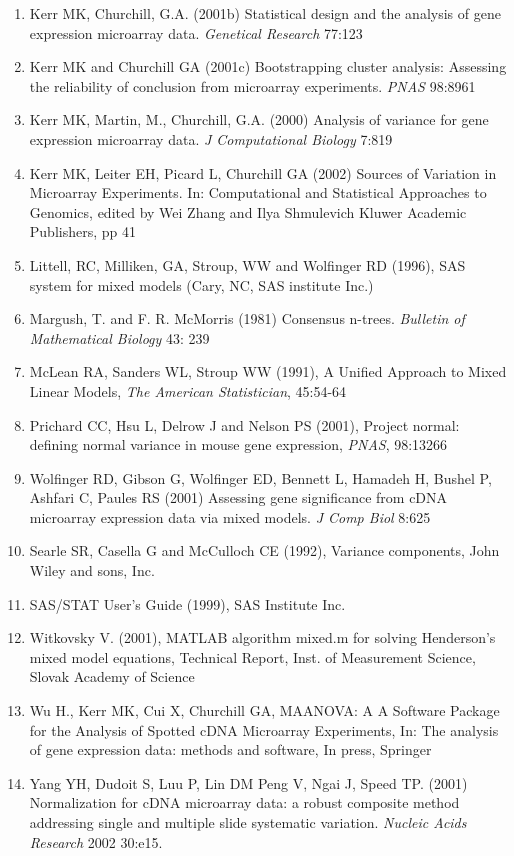 \begin{enumerate}
\item Kerr MK, Churchill, G.A. (2001b)
Statistical design and the analysis of gene expression microarray data.
\textit{Genetical Research} 77:123

\item Kerr MK and Churchill GA (2001c)
Bootstrapping cluster analysis: Assessing the reliability of conclusion from
microarray experiments.  \textit{PNAS} 98:8961

\item Kerr MK, Martin, M., Churchill, G.A. (2000)
Analysis of variance for gene expression microarray data.
\textit{J Computational Biology} 7:819

\item Kerr MK, Leiter EH, Picard L, Churchill GA (2002)
Sources of Variation in Microarray Experiments.
 In:
Computational and Statistical Approaches to Genomics, edited by
Wei Zhang and Ilya Shmulevich
Kluwer Academic Publishers, pp 41

\item Littell, RC, Milliken, GA, Stroup, WW and Wolfinger RD (1996), 
SAS system for mixed models (Cary, NC, SAS institute Inc.)

\item Margush, T. and F. R. McMorris (1981) Consensus n-trees.
\textit{Bulletin of Mathematical Biology} 43: 239

\item McLean RA, Sanders WL, Stroup WW (1991), A Unified Approach to
Mixed Linear Models, \textit{The American Statistician}, 45:54-64

\item Prichard CC, Hsu L, Delrow J and Nelson PS (2001), 
Project normal: defining normal variance in mouse gene expression, 
\textit{PNAS}, 98:13266

\item Wolfinger RD, Gibson G, Wolfinger ED, Bennett L, Hamadeh H, Bushel P,
Ashfari C, Paules RS (2001)
Assessing gene significance from cDNA microarray
expression data via mixed models.
\textit{J Comp Biol} 8:625

\item Searle SR, Casella G and McCulloch CE (1992), Variance components, 
John Wiley and sons, Inc.

\item SAS/STAT User's Guide (1999), SAS Institute Inc.

\item Witkovsky V. (2001), MATLAB algorithm mixed.m for solving Henderson's
mixed model equations, Technical Report, Inst. of Measurement Science,
Slovak Academy of Science
\item Wu H., Kerr MK, Cui X, Churchill GA, MAANOVA: A A Software Package for the
Analysis of Spotted cDNA Microarray Experiments, 
In: The analysis of gene expression data: methods and software,
In press, Springer

\item Yang YH, Dudoit S, Luu P, Lin DM Peng V, Ngai J, Speed TP. (2001)
Normalization for cDNA microarray data:  a robust composite method addressing
single and multiple slide systematic variation.
\textit{Nucleic Acids Research} 2002 30:e15.


\end{enumerate}

